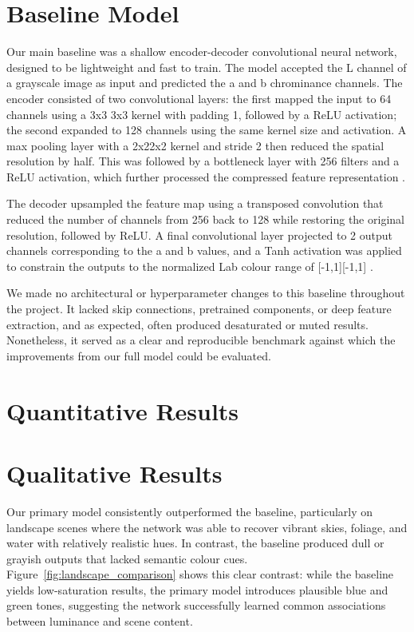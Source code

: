 \documentclass{article} %
\begin{document}
\section{Baseline Model}
\label{baseline}

Our main baseline was a shallow encoder-decoder convolutional neural network, designed to be lightweight and fast to train. The model accepted the L channel of a grayscale image as 
input and predicted the a and b chrominance channels. The encoder consisted of two convolutional layers: the first mapped the input to 64 channels using a 3x3 3x3 kernel with padding 1, 
followed by a ReLU activation; the second expanded to 128 channels using the same kernel size and activation. A max pooling layer with a 2x22x2 kernel and stride 2 then reduced the 
spatial resolution by half. This was followed by a bottleneck layer with 256 filters and a ReLU activation, which further processed the compressed feature representation \citep{leatvanich2025image}.

The decoder upsampled the feature map using a transposed convolution that reduced the number of channels from 256 back to 128 while restoring the original resolution, followed by ReLU. 
A final convolutional layer projected to 2 output channels corresponding to the a and b values, and a Tanh activation was applied to constrain the outputs to the normalized Lab colour 
range of [-1,1][-1,1] \citep{rosebrock2019bwcolorization}.

We made no architectural or hyperparameter changes to this baseline throughout the project. It lacked skip connections, pretrained components, or deep 
feature extraction, and as expected, often produced desaturated or muted results. Nonetheless, it served as a clear and reproducible benchmark against which the improvements from our 
full model could be evaluated.

\section{Quantitative Results}
\label{quant_results}

\section{Qualitative Results}
\label{qual_results}

Our primary model consistently outperformed the baseline, particularly on landscape scenes where the network was able to recover vibrant skies, foliage, and water with relatively 
realistic hues. In contrast, the baseline produced dull or grayish outputs that lacked semantic colour cues. Figure~\ref{fig:landscape_comparison} shows this clear contrast: while 
the baseline yields low-saturation results, the primary model introduces plausible blue and green tones, suggesting the network successfully learned common associations between luminance 
and scene content.
\end{document}
